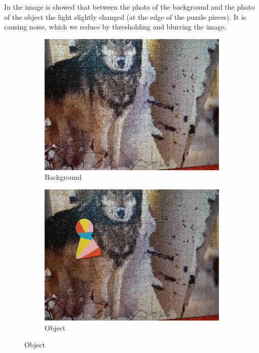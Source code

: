 In the image is showed that between the photo of the background and the photo
of the object the light slightly changed (at the edge of the puzzle pieces). It
is causing noise, which we reduce by thresholding and blurring the image.

\begin{figure}
  \centering
  \begin{subfigure}[b]{0.48\linewidth}
    \includegraphics[width=\linewidth]{img/simple_background/background.jpg}
    \caption{Background}
  \end{subfigure}
  \begin{subfigure}[b]{0.48\linewidth}
    \includegraphics[width=\linewidth]{img/simple_background/object.jpg}
    \caption{Object}

\end{subfigure}
\end{figure}
